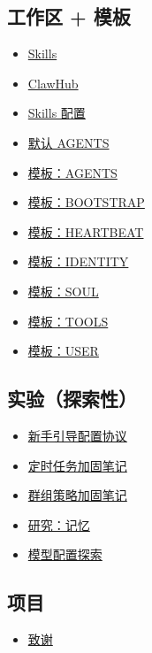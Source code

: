 \subsection{工作区 + 模板}


\begin{itemize}
  \item \href{/tools/skills}{Skills}
  \item \href{/tools/clawhub}{ClawHub}
  \item \href{/tools/skills-config}{Skills 配置}
  \item \href{/reference/AGENTS.default}{默认 AGENTS}
  \item \href{/reference/templates/AGENTS}{模板：AGENTS}
  \item \href{/reference/templates/BOOTSTRAP}{模板：BOOTSTRAP}
  \item \href{/reference/templates/HEARTBEAT}{模板：HEARTBEAT}
  \item \href{/reference/templates/IDENTITY}{模板：IDENTITY}
  \item \href{/reference/templates/SOUL}{模板：SOUL}
  \item \href{/reference/templates/TOOLS}{模板：TOOLS}
  \item \href{/reference/templates/USER}{模板：USER}
\end{itemize}


\subsection{实验（探索性）}


\begin{itemize}
  \item \href{/experiments/onboarding-config-protocol}{新手引导配置协议}
  \item \href{/experiments/plans/cron-add-hardening}{定时任务加固笔记}
  \item \href{/experiments/plans/group-policy-hardening}{群组策略加固笔记}
  \item \href{/experiments/research/memory}{研究：记忆}
  \item \href{/experiments/proposals/model-config}{模型配置探索}
\end{itemize}


\subsection{项目}


\begin{itemize}
  \item \href{/reference/credits}{致谢}
\end{itemize}


